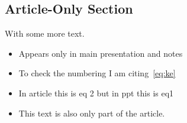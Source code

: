 \subsection<article>{Article-Only Section}
With some more text.
\begin{frame}[label=main]
\begin{itemize}
\item Appears only in main presentation and notes
\item To check the numbering I am citing~\cref{eq:ke}
\item In article this is eq 2 but in ppt this is eq1
\item<presentation:only@0> This text is also only part of the article.
\end{itemize}
\end{frame}

